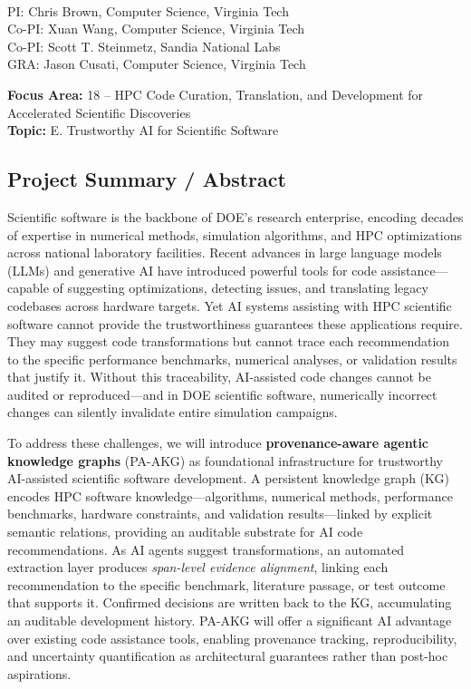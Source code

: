 \begin{center}
    \large{\proposalEighteen} \\ \vspace{0.5pt}
\footnotesize{PI: Chris Brown, Computer Science, Virginia Tech} \\
\footnotesize{Co-PI: Xuan Wang, Computer Science, Virginia Tech} \\
\footnotesize{Co-PI: Scott T. Steinmetz, Sandia National Labs} \\
\footnotesize{GRA: Jason Cusati, Computer Science, Virginia Tech}
\end{center}

\small{\noindent\textbf{Focus Area:} 18 -- HPC Code Curation, Translation, and Development for Accelerated Scientific Discoveries} \hfill \\
\small{\textbf{Topic:} E. Trustworthy AI for Scientific Software}

\subsection*{Project Summary / Abstract}

Scientific software is the backbone of DOE's research enterprise, encoding decades of expertise in numerical methods, simulation algorithms, and HPC optimizations across national laboratory facilities. Recent advances in large language models (LLMs) and generative AI have introduced powerful tools for code assistance---capable of suggesting optimizations, detecting issues, and translating legacy codebases across hardware targets. Yet AI systems assisting with HPC scientific software cannot provide the trustworthiness guarantees these applications require. They may suggest code transformations but cannot trace each recommendation to the specific performance benchmarks, numerical analyses, or validation results that justify it. Without this traceability, AI-assisted code changes cannot be audited or reproduced---and in DOE scientific software, numerically incorrect changes can silently invalidate entire simulation campaigns.

To address these challenges, we will introduce \textbf{provenance-aware agentic knowledge graphs} (PA-AKG) as foundational infrastructure for trustworthy AI-assisted scientific software development. A persistent knowledge graph (KG) encodes HPC software knowledge---algorithms, numerical methods, performance benchmarks, hardware constraints, and validation results---linked by explicit semantic relations, providing an auditable substrate for AI code recommendations. As AI agents suggest transformations, an automated extraction layer produces \textit{span-level evidence alignment}, linking each recommendation to the specific benchmark, literature passage, or test outcome that supports it. Confirmed decisions are written back to the KG, accumulating an auditable development history. PA-AKG will offer a significant AI advantage over existing code assistance tools, enabling provenance tracking, reproducibility, and uncertainty quantification as architectural guarantees rather than post-hoc aspirations.

